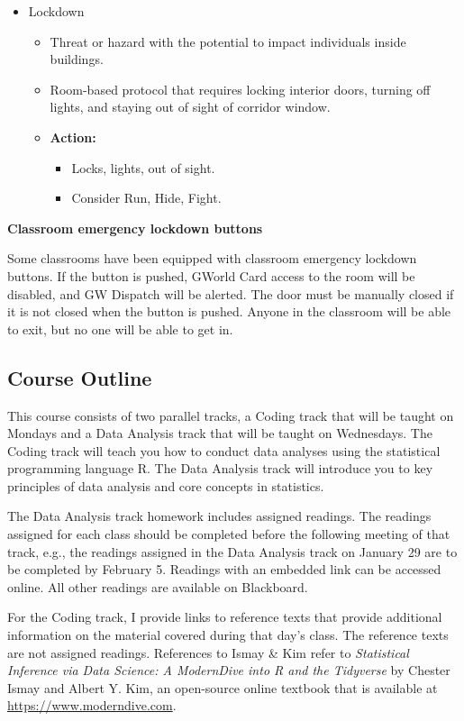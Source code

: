 \documentclass[12pt,letterpaper]{article}
\begin{document}
\begin{itemize}
\begin{itemize}
    \end{itemize}
    \item Lockdown
    \begin{itemize}
        \item Threat or hazard with the potential to impact individuals inside buildings.
        \item Room-based protocol that requires locking interior doors, turning off lights, and staying out of sight of corridor window.
        \item \textbf{Action:}
        \begin{itemize}
            \item Locks, lights, out of sight.
            \item Consider Run, Hide, Fight.
        \end{itemize}
    \end{itemize}
\end{itemize}

\textbf{Classroom emergency lockdown buttons}

Some classrooms have been equipped with classroom emergency lockdown buttons. If the button is pushed, GWorld Card access to the room will be disabled, and GW Dispatch will be alerted. The door must be manually closed if it is not closed when the button is pushed. Anyone in the classroom will be able to exit, but no one will be able to get in.

\subsection*{Course Outline}

This course consists of two parallel tracks, a Coding track that will be taught on Mondays and a Data Analysis track that will be taught on Wednesdays. The Coding track will teach you how to conduct data analyses using the statistical programming language R. The Data Analysis track will introduce you to key principles of data analysis and core concepts in statistics. 

The Data Analysis track homework includes assigned readings. The readings assigned for each class should be completed before the following meeting of that track, e.g., the readings assigned in the Data Analysis track on January 29 are to be completed by February 5. Readings with an embedded link can be accessed online. All other readings are available on Blackboard.

For the Coding track, I provide links to reference texts that provide additional information on the material covered during that day's class. The reference texts are not assigned readings. References to Ismay \& Kim refer to \emph{Statistical Inference via Data Science: A ModernDive into R and the Tidyverse} by Chester Ismay and Albert Y. Kim, an open-source online textbook that is available at \href{https://www.moderndive.com}{https://www.moderndive.com}.
\end{document}
